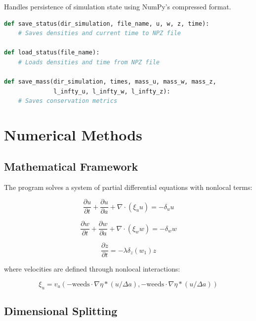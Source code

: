 \documentclass[12pt,a4paper]{report}
\begin{document}
Handles persistence of simulation state using NumPy's compressed format.

\begin{lstlisting}[language=Python]
def save_status(dir_simulation, file_name, u, w, z, time):
    # Saves densities and current time to NPZ file
    
def load_status(file_name):
    # Loads densities and time from NPZ file
    
def save_mass(dir_simulation, times, mass_u, mass_w, mass_z, 
              l_infty_u, l_infty_w, l_infty_z):
    # Saves conservation metrics
\end{lstlisting}

\chapter{Numerical Methods}

\section{Mathematical Framework}

The program solves a system of partial differential equations with nonlocal terms:

\begin{equation}
\frac{\partial u}{\partial t} + \frac{\partial u}{\partial a} + \nabla \cdot (\xi_u u) = -\delta_u u
\end{equation}

\begin{equation}
\frac{\partial w}{\partial t} + \frac{\partial w}{\partial a} + \nabla \cdot (\xi_w w) = -\delta_w w
\end{equation}

\begin{equation}
\frac{\partial z}{\partial t} = -\lambda \delta_z(w_1) z
\end{equation}

where velocities are defined through nonlocal interactions:

\begin{equation}
\xi_u = v_u(-\text{weeds} \cdot \nabla\eta * (u/\Delta a), -\text{weeds} \cdot \nabla\eta * (u/\Delta a))
\end{equation}

\section{Dimensional Splitting}
\end{document}
